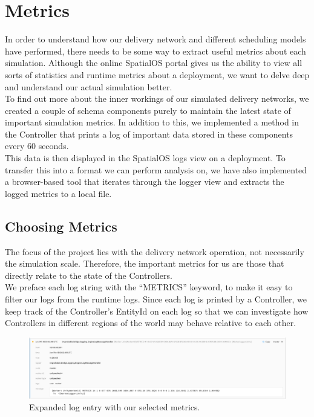 \documentclass[a4paper,11pt,titlepage]{report}
\begin{document}
\section{Metrics}
In order to understand how our delivery network and different scheduling models have performed, there needs to be some way to extract useful metrics about each simulation. Although the online SpatialOS portal gives us the ability to view all sorts of statistics and runtime metrics about a deployment, we want to delve deep and understand our actual simulation better.\\

To find out more about the inner workings of our simulated delivery networks, we created a couple of schema components purely to maintain the latest state of important simulation metrics. In addition to this, we implemented a method in the Controller that prints a log of important data stored in these components every 60 seconds.\\

This data is then displayed in the SpatialOS logs view on a deployment. To transfer this into a format we can perform analysis on, we have also implemented a browser-based tool that iterates through the logger view and extracts the logged metrics to a local file.

\subsection{Choosing Metrics}
The focus of the project lies with the delivery network operation, not necessarily the simulation scale. Therefore, the important metrics for us are those that directly relate to the state of the Controllers.\\

We preface each log string with the ``METRICS'' keyword, to make it easy to filter our logs from the runtime logs. Since each log is printed by a Controller, we keep track of the Controller's EntityId on each log so that we can investigate how Controllers in different regions of the world may behave relative to each other.

\begin{figure}[!hbpt]
  \center
  \includegraphics[width=\linewidth]{img/example_log_view_full.png}
  \caption{Expanded log entry with our selected metrics.}
  \label{fig:example_log_view_full}
\end{figure}
\end{document}
